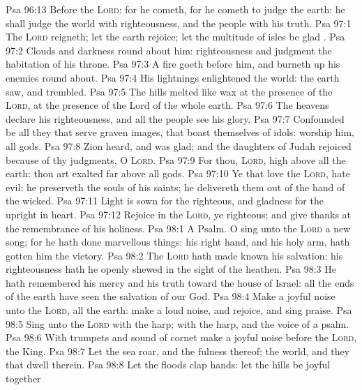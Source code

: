 \vs Psa 96:13 Before the \textsc{Lord}: for he cometh, for he cometh to judge the earth: he shall judge the world with righteousness, and the people with his truth.
\vs Psa 97:1 The \textsc{Lord} reigneth; let the earth rejoice; let the multitude of isles be glad .
\vs Psa 97:2 Clouds and darkness  round about him: righteousness and judgment  the habitation of his throne.
\vs Psa 97:3 A fire goeth before him, and burneth up his enemies round about.
\vs Psa 97:4 His lightnings enlightened the world: the earth saw, and trembled.
\vs Psa 97:5 The hills melted like wax at the presence of the \textsc{Lord}, at the presence of the Lord of the whole earth.
\vs Psa 97:6 The heavens declare his righteousness, and all the people see his glory.
\vs Psa 97:7 Confounded be all they that serve graven images, that boast themselves of idols: worship him, all  gods.
\vs Psa 97:8 Zion heard, and was glad; and the daughters of Judah rejoiced because of thy judgments, O \textsc{Lord}.
\vs Psa 97:9 For thou, \textsc{Lord},  high above all the earth: thou art exalted far above all gods.
\vs Psa 97:10 Ye that love the \textsc{Lord}, hate evil: he preserveth the souls of his saints; he delivereth them out of the hand of the wicked.
\vs Psa 97:11 Light is sown for the righteous, and gladness for the upright in heart.
\vs Psa 97:12 Rejoice in the \textsc{Lord}, ye righteous; and give thanks at the remembrance of his holiness.
\vs Psa 98:1 A Psalm. O sing unto the \textsc{Lord} a new song; for he hath done marvellous things: his right hand, and his holy arm, hath gotten him the victory.
\vs Psa 98:2 The \textsc{Lord} hath made known his salvation: his righteousness hath he openly shewed in the sight of the heathen.
\vs Psa 98:3 He hath remembered his mercy and his truth toward the house of Israel: all the ends of the earth have seen the salvation of our God.
\vs Psa 98:4 Make a joyful noise unto the \textsc{Lord}, all the earth: make a loud noise, and rejoice, and sing praise.
\vs Psa 98:5 Sing unto the \textsc{Lord} with the harp; with the harp, and the voice of a psalm.
\vs Psa 98:6 With trumpets and sound of cornet make a joyful noise before the \textsc{Lord}, the King.
\vs Psa 98:7 Let the sea roar, and the fulness thereof; the world, and they that dwell therein.
\vs Psa 98:8 Let the floods clap  hands: let the hills be joyful together
